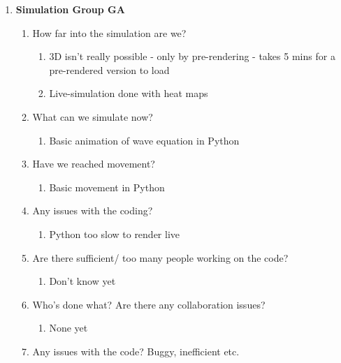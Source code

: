 \begin{enumerate}
\item  \textbf{Simulation Group GA}

\begin{enumerate}
\item \textbf{ }How far into the simulation are we?

\begin{enumerate}
\item  3D isn't really possible - only by pre-rendering - takes 5 mins for a pre-rendered version to load

\item  Live-simulation done with heat maps
\end{enumerate}

\item  What can we simulate now?

\begin{enumerate}
\item  Basic animation of wave equation in Python
\end{enumerate}

\item  Have we reached movement?

\begin{enumerate}
\item  Basic movement in Python
\end{enumerate}

\item  Any issues with the coding? 

\begin{enumerate}
\item  Python too slow to render live
\end{enumerate}

\item  Are there sufficient/ too many people working on the code? 

\begin{enumerate}
\item  Don't know yet
\end{enumerate}

\item  Who's done what? Are there any collaboration issues? 

\begin{enumerate}
\item  None yet
\end{enumerate}

\item  Any issues with the code? Buggy, inefficient etc. 


\end{enumerate}
\end{enumerate}
